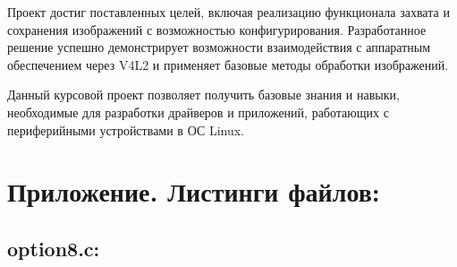 \documentclass[12pt]{article}
\begin{document}
Проект достиг поставленных целей, включая реализацию функционала захвата и сохранения изображений с возможностью конфигурирования. Разработанное решение успешно демонстрирует возможности взаимодействия с аппаратным обеспечением через V4L2 и применяет базовые методы обработки изображений.

Данный курсовой проект позволяет получить базовые знания и навыки, необходимые для разработки драйверов и приложений, работающих с периферийными устройствами в ОС Linux.

\section*{Приложение. Листинги файлов:}

\subsection*{option8.c:}
\end{document}
